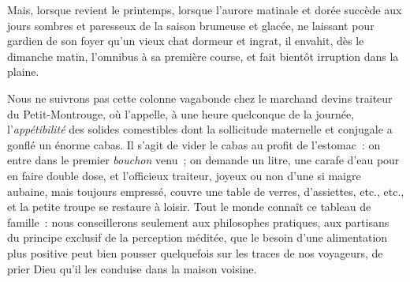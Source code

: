 \documentclass[french,twoside]{book} %
\begin{document}
Mais, lorsque revient le printemps, lorsque l’aurore matinale et dorée succède aux jours sombres et paresseux de la saison brumeuse et glacée, ne laissant pour gardien de son foyer qu’un vieux chat dormeur et ingrat, il envahit, dès le dimanche matin, l’omnibus à sa première course, et fait bientôt irruption dans la plaine.\par
Nous ne suivrons pas cette colonne vagabonde chez le marchand devins traiteur du Petit-Montrouge, où l’appelle, à une heure quelconque de la journée, l’\emph{appétibilité} des solides comestibles dont la sollicitude maternelle et conjugale a gonflé un énorme cabas.  Il s’agit de vider le cabas au profit de l’estomac : on entre dans le premier \emph{bouchon} venu ; on demande un litre, une carafe d’eau pour en faire double dose, et l’officieux traiteur, joyeux ou non d’une si maigre aubaine, mais toujours empressé, couvre une table de verres, d’assiettes, etc., etc., et la petite troupe se restaure à loisir. Tout le monde connaît ce tableau de famille : nous conseillerons seulement aux philosophes pratiques, aux partisans du principe exclusif de la perception méditée, que le besoin d’une alimentation plus positive peut bien pousser quelquefois sur les traces de nos voyageurs, de prier Dieu qu’il les conduise dans la maison voisine.\par
\end{document}

